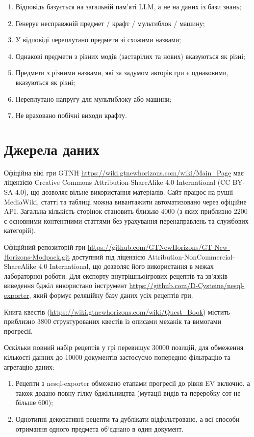 \begin{enumerate}[wide,beginpenalty=10000]
    \item Відповідь базується на загальній пам'яті LLM, а не на даних із бази знань;
    \item Генерує несправжній предмет / крафт / мультиблок / машину;
    \item У відповіді переплутано предмети зі схожими назвами;
    \item Однакові предмети з різних модів (застарілих та нових) вказуються як різні;
    \item Предмети з різними назвами, які за задумом авторів гри є однаковими, вказуються як різні;
    \item Переплутано напругу для мультиблоку або машини;
    \item Не враховано побічні виходи крафту.
\end{enumerate}

\section{Джерела даних}

Офіційна вікі гри GTNH \url{https://wiki.gtnewhorizons.com/wiki/Main_Page} має ліцензією Creative Commons Attribution-ShareAlike 4.0 International (CC BY-SA 4.0), що дозволяє вільне використання матеріалів. Сайт працює на рушії MediaWiki, статті та таблиці можна вивантажити автоматизовано через офіційне API. Загальна кількість сторінок становить близько 4000 (з яких приблизно 2200 є основними контентними статтями без урахування перенаправлень та службових категорій).

Офіційний репозиторій гри \url{https://github.com/GTNewHorizons/GT-New-Horizons-Modpack.git} доступний під ліцензією Attribution-NonCommercial-ShareAlike 4.0 International, що дозволяє його використання в межах лабораторної роботи. Для експорту внутрішньоігрових рецептів та зв'язків виведення бджіл використано інструмент \url{https://github.com/D-Cysteine/nesql-exporter}, який формує реляційну базу даних усіх рецептів гри.

Книга квестів (\url{https://wiki.gtnewhorizons.com/wiki/Quest_Book}) містить приблизно 3800 структурованих квестів із описами механік та вимогами прогресії.

Оскільки повний набір рецептів у грі перевищує 30000 позицій, для обмеження кількості данних до 10000 документів застосуємо попередню фільтрацію та агрегацію даних:
\begin{enumerate}[wide,beginpenalty=10000]
    \item Рецепти з nesql-exporter обмежено етапами прогресії до рівня EV включно, а також додано повну гілку бджільництва (мутації видів та переробку сот не більше 600);
    \item Однотипні декоративні рецепти та дублікати відфільтровано, а всі способи отримання одного предмета об'єднано в один документ.
\end{enumerate}

